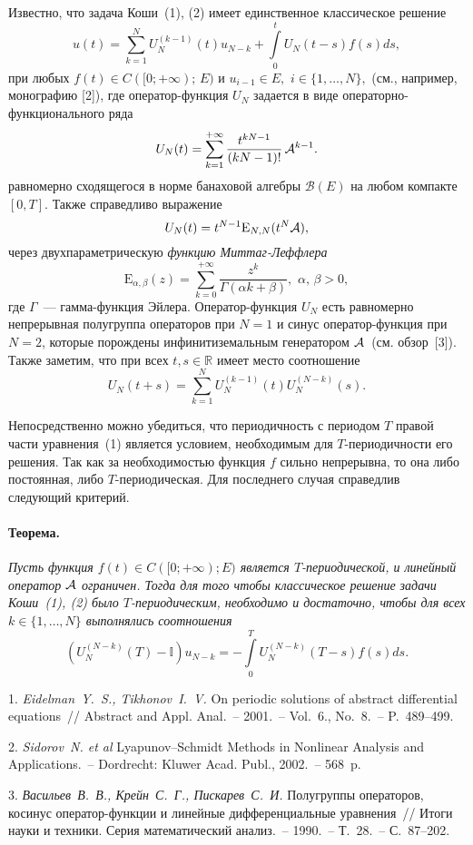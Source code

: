 Известно, что задача Коши~(1), (2) имеет единственное классическое решение
$$
u(t)=\sum\limits_{k=1}^{N}U_{N}^{(k-1)}(t)u_{N-k}+\int\limits_{0}^{t}U_{N}(t-s)f(s)ds,
$$
при любых $f(t)\in C([0;+\infty);\,E)$ и $u_{i-1}\in E,\,\,i\in\lbrace 1,\ldots,N\rbrace,$ (см., например, монографию [2]), где оператор-функция $U_{N}$ задается в виде операторно-функционального ряда
$$
U_{N}(t)=\sum\limits_{k=1}^{+\infty}\frac{t^{kN-1}}{(kN-1)!}\,{\cal A}^{k-1}.
$$
равномерно сходящегося в норме банаховой алгебры ${\mathscr B}(E)$ на любом компакте $[0,T]$. Также справедливо выражение
$$
U_{N}(t)=t^{N-1}{\mathrm E}_{N,N}(t^{N}{\cal A}),
$$
через двухпараметрическую {\it функцию Миттаг-Леффлера}
$$
{\mathrm E}_{\alpha,\beta}(z)=\sum\limits_{k=0}^{+\infty}\frac{z^{k}}{\Gamma(\alpha k+\beta)},\,\,\alpha,\,\beta>0,
$$
где $\Gamma$~--- гамма-функция Эйлера. Оператор-функция $U_{N}$ есть равномерно непрерывная полугруппа операторов при $N=1$ и синус оператор-функция при $N=2$, которые порождены инфинитиземальным генератором ${\cal A}$~(см. обзор~[3]). Также заметим, что при всех $t,s\in{\mathbb R}$ имеет место  соотношение
$$
U_{N}(t+s)=\sum\limits_{k=1}^{N}U_{N}^{(k-1)}(t)U_{N}^{(N-k)}(s).
$$

Непосредственно можно убедиться, что периодичность с периодом $T$ правой части  уравнения~(1) является условием, необходимым для $T$-периодичности его решения. Так как за необходимостью функция $f$ сильно непрерывна, то она либо постоянная, либо $T$-периодическая. Для последнего случая справедлив следующий критерий.

\paragraph{Теорема.} {\it Пусть функция $f(t)\in C([0;+\infty);E)$ является $T$-периодической, и линейный оператор ${\cal A}$ ограничен. Тогда для того чтобы классическое решение задачи Коши~(1), (2) было $T$-периодическим,  необходимо и достаточно, чтобы для всех $k\in\lbrace 1,\ldots,N\rbrace$ выполнялись соотношения
$$
(U_{N}^{(N-k)}(T)-{\mathbb I})u_{N-k}=-\int\limits_{0}^{T}U_{N}^{(N-k)}(T-s)f(s)ds.
$$}

\litlist

1. {\it Eidelman~Y.~S., Tikhonov~I.~V.} On periodic solutions of abstract differential equations~// Abstract and Appl. Anal.~– 2001.~– Vol.~6., No.~8.~– P.~489–499.

2. {\it Sidorov~N. et al} Lyapunov–Schmidt Methods in Nonlinear Analysis and Applications.~– Dordrecht: Kluwer Acad. Publ., 2002.~– 568~p.

3. {\it Васильев~В.~В., Крейн~С.~Г., Пискарев~С.~И.} Полугруппы операторов, косинус оператор-функции и линейные дифференциальные уравнения~// Итоги науки и техники. Серия математический анализ.~– 1990.~– Т.~28.~– С.~87–202.
